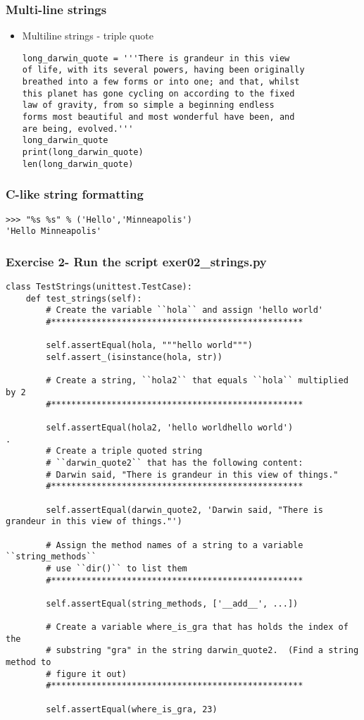 \documentclass{beamer}
\newcommand\Fontvi{\fontsize{6}{7.2}\selectfont}
\newcommand\Fontix{\fontsize{9}{8.3}\selectfont}
\begin{document}
\begin{frame}[fragile]
\frametitle{Multi-line strings}
\Fontix
\begin{itemize}
\item Multiline strings - triple quote
\begin{lstlisting}
long_darwin_quote = '''There is grandeur in this view
of life, with its several powers, having been originally 
breathed into a few forms or into one; and that, whilst 
this planet has gone cycling on according to the fixed 
law of gravity, from so simple a beginning endless 
forms most beautiful and most wonderful have been, and 
are being, evolved.'''
long_darwin_quote
print(long_darwin_quote)
len(long_darwin_quote)
\end{lstlisting}
\end{itemize}
\end{frame}

\begin{frame}[fragile]
\frametitle{C-like string formatting}
\begin{lstlisting}
>>> "%s %s" % ('Hello','Minneapolis')
'Hello Minneapolis'
\end{lstlisting}
\end{frame}

\begin{frame}[fragile]
\frametitle{Exercise 2- Run the script exer02\_strings.py}
\Fontvi
\begin{lstlisting}
class TestStrings(unittest.TestCase):
    def test_strings(self):
        # Create the variable ``hola`` and assign 'hello world'
        #**************************************************

        self.assertEqual(hola, """hello world""")
        self.assert_(isinstance(hola, str))

        # Create a string, ``hola2`` that equals ``hola`` multiplied by 2
        #**************************************************

        self.assertEqual(hola2, 'hello worldhello world')
.
        # Create a triple quoted string
        # ``darwin_quote2`` that has the following content:
        # Darwin said, "There is grandeur in this view of things."
        #**************************************************

        self.assertEqual(darwin_quote2, 'Darwin said, "There is grandeur in this view of things."')

        # Assign the method names of a string to a variable ``string_methods``
        # use ``dir()`` to list them
        #**************************************************

        self.assertEqual(string_methods, ['__add__', ...])

        # Create a variable where_is_gra that has holds the index of the
        # substring "gra" in the string darwin_quote2.  (Find a string method to
        # figure it out)
        #**************************************************

        self.assertEqual(where_is_gra, 23)

\end{lstlisting}
\end{frame}
\end{document}
